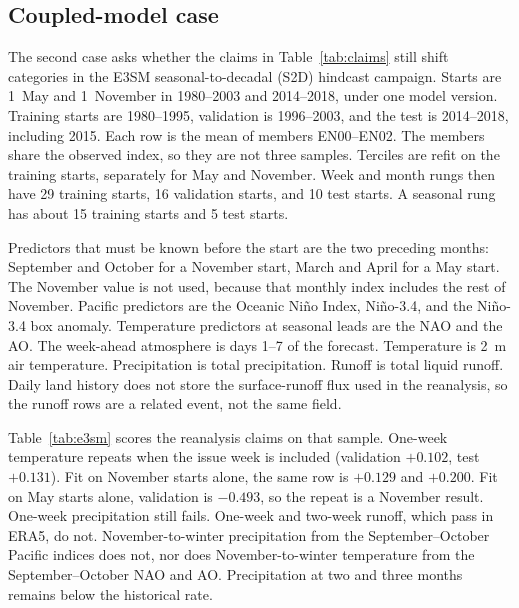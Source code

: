 \documentclass{ametsocV6.2}
\begin{document}
\subsection{Coupled-model case}
\label{sec:e3sm}

The second case asks whether the claims in Table~\ref{tab:claims} still shift categories in the E3SM seasonal-to-decadal (S2D) hindcast campaign.
Starts are 1~May and 1~November in 1980--2003 and 2014--2018, under one model version.
Training starts are 1980--1995, validation is 1996--2003, and the test is 2014--2018, including 2015.
Each row is the mean of members EN00--EN02.
The members share the observed index, so they are not three samples.
Terciles are refit on the training starts, separately for May and November.
Week and month rungs then have 29 training starts, 16 validation starts, and 10 test starts.
A seasonal rung has about 15 training starts and 5 test starts.

Predictors that must be known before the start are the two preceding months: September and October for a November start, March and April for a May start.
The November value is not used, because that monthly index includes the rest of November.
Pacific predictors are the Oceanic Ni\~{n}o Index, Ni\~{n}o-3.4, and the Ni\~{n}o-3.4 box anomaly.
Temperature predictors at seasonal leads are the NAO and the AO.
The week-ahead atmosphere is days 1--7 of the forecast.
Temperature is 2~m air temperature.
Precipitation is total precipitation.
Runoff is total liquid runoff.
Daily land history does not store the surface-runoff flux used in the reanalysis, so the runoff rows are a related event, not the same field.

Table~\ref{tab:e3sm} scores the reanalysis claims on that sample.
One-week temperature repeats when the issue week is included (validation $+0.102$, test $+0.131$).
Fit on November starts alone, the same row is $+0.129$ and $+0.200$.
Fit on May starts alone, validation is $-0.493$, so the repeat is a November result.
One-week precipitation still fails.
One-week and two-week runoff, which pass in ERA5, do not.
November-to-winter precipitation from the September--October Pacific indices does not, nor does November-to-winter temperature from the September--October NAO and AO.
Precipitation at two and three months remains below the historical rate.
\end{document}

